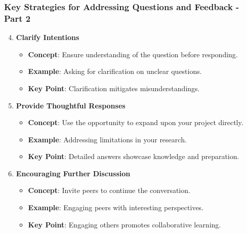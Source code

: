 \documentclass[aspectratio=169]{beamer}
\begin{document}
\begin{frame}[fragile]
    \frametitle{Key Strategies for Addressing Questions and Feedback - Part 2}
    \begin{enumerate}
        \setcounter{enumi}{3} %
        \item \textbf{Clarify Intentions}
        \begin{itemize}
            \item \textbf{Concept}: Ensure understanding of the question before responding.
            \item \textbf{Example}: Asking for clarification on unclear questions.
            \item \textbf{Key Point}: Clarification mitigates misunderstandings.
        \end{itemize}

        \item \textbf{Provide Thoughtful Responses}
        \begin{itemize}
            \item \textbf{Concept}: Use the opportunity to expand upon your project directly.
            \item \textbf{Example}: Addressing limitations in your research.
            \item \textbf{Key Point}: Detailed answers showcase knowledge and preparation.
        \end{itemize}
        
        \item \textbf{Encouraging Further Discussion}
        \begin{itemize}
            \item \textbf{Concept}: Invite peers to continue the conversation.
            \item \textbf{Example}: Engaging peers with interesting perspectives.
            \item \textbf{Key Point}: Engaging others promotes collaborative learning.
        \end{itemize}
    \end{enumerate}
\end{frame}
\end{document}
